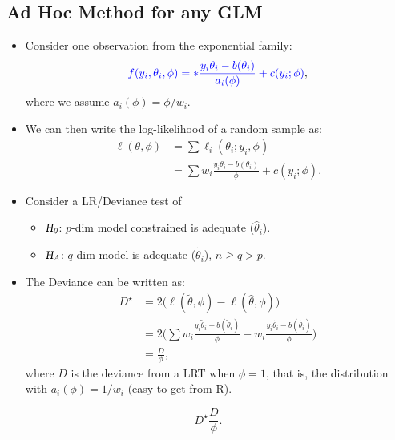 \documentclass{article}\usepackage[]{graphicx}\usepackage[svgnames]{xcolor}
\let\exp\relax%
\newcommand{\HN}{\textsl{H}_{\textsl{0}}}%
\newcommand{\HA}{\textsl{H}_{\textsl{A}}}%
\begin{document}
\subsection*{Ad Hoc Method for any GLM}
\begin{itemize}
      \item Consider one observation from the exponential family:
            \[ \textcolor{Blue}{f(y_i,\theta_i,\phi)=\exp*{\frac{y_i\theta_i-b(\theta_i)}{a_i(\phi)}+c(y_i;\phi)}}, \]
            where we assume $ a_i(\phi)=\phi/w_i $.
      \item We can then write the log-likelihood of a random sample as:
            \begin{align*}
                  \ell(\theta,\phi)
                   & =\sum \ell_i(\theta_i;y_i,\phi)                             \\
                   & =\sum w_i \frac{y_i\theta_i-b(\theta_i)}{\phi}+c(y_i;\phi).
            \end{align*}
      \item Consider a LR/Deviance test of
            \begin{itemize}
                  \item $ \HN $: $ p $-dim model constrained is adequate ($ \hat{\theta}_i $).
                  \item $ \HA $: $ q $-dim model is adequate ($ \tilde{\theta}_i $), $ n\ge q>p $.
            \end{itemize}
      \item The Deviance can be written as:
            \begin{align*}
                  D^\star
                   & =2\bigl(\ell(\tilde{\theta},\phi)-\ell(\hat{\theta},\phi)\bigr)                                                                         \\
                   & =2\biggl(\sum  w_i \frac{y_i\tilde{\theta}_i-b(\tilde{\theta}_i)}{\phi} -  w_i \frac{y_i\hat{\theta}_i-b(\hat{\theta}_i)}{\phi} \biggr) \\
                   & =\frac{D}{\phi},
            \end{align*}
            where $ D $ is the deviance from a LRT when $ \phi=1 $, that is, the distribution with $ a_i(\phi)=1/w_i $ (easy to get from R).
\end{itemize}
\[ D^\star \frac{D}{\phi}. \]
\end{document}

